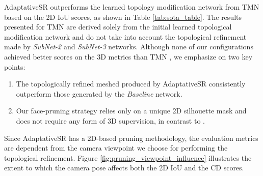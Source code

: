AdaptativeSR outperforms the learned topology modification network from TMN \citep{pan2019deep} based on the 2D \ac{IoU} scores, as shown in Table \ref{tab:sota_table}. The results presented for TMN \citep{pan2019deep} are derived solely from the initial learned topological modification network and do not take into account the topological refinement made by \textit{SubNet-2} and \textit{SubNet-3} networks. Although none of our configurations achieved better scores on the 3D metrics than TMN \citep{pan2019deep}, we emphasize on two key points: \begin{enumerate}
    \item The topologically refined meshed produced by AdaptativeSR consistently outperform those generated by the \textit{Baseline} network.  
    \item Our face-pruning strategy relies only on a unique 2D silhouette mask and does not require any form of 3D supervision, in contrast to \citep{pan2019deep}. 
\end{enumerate}

Since AdaptativeSR has a 2D-based pruning methodology, the evaluation metrics are dependent from the camera viewpoint we choose for performing the topological refinement. Figure \ref{fig:pruning_viewpoint_influence} illustrates the extent to which the camera pose affects both the 2D \ac{IoU} and the \ac{CD} scores.

